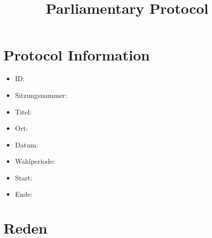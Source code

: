 \documentclass{article}
\title{Parliamentary Protocol}
\begin{document}
    \maketitle
    \section{Protocol Information}
    \begin{itemize}
        \item ID: %
        \item Sitzungsnummer: %
        \item Titel: %
        \item Ort: %
        \item Datum: %
        \item Wahlperiode: %
        \item Start: %
        \item Ende: %
    \end{itemize}
    \section{Reden}
\end{document}
